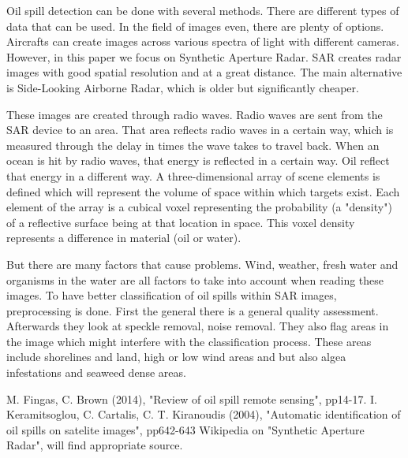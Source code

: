 \hspace{0.5cm} Oil spill detection can be done with several methods. There are different types of data that can be used. In the field of images even, there are plenty of options. Aircrafts can create images across various spectra of light with different cameras. However, in this paper we focus on Synthetic Aperture Radar. SAR creates radar images with good spatial resolution and at a great distance. The main alternative is Side-Looking Airborne Radar, which is older but significantly cheaper. 

These images are created through radio waves. Radio waves are sent from the SAR device to an area. That area reflects radio waves in a certain way, which is measured through the delay in times the wave takes to travel back. When an ocean is hit by radio waves, that energy is reflected in a certain way. Oil reflect that energy in a different way. A three-dimensional array of scene elements is defined which will represent the volume of space within which targets exist. Each element of the array is a cubical voxel representing the probability (a "density") of a reflective surface being at that location in space. This voxel density represents a difference in material (oil or water).

But there are many factors that cause problems. Wind, weather, fresh water and organisms in the water are all factors to take into account when reading these images. To have better classification of oil spills within SAR images, preprocessing is done. First the general there is a general quality assessment. Afterwards they look at speckle removal, noise removal. They also flag areas in the image which might interfere with the classification process. These areas include shorelines and land, high or low wind areas and but also algea infestations and seaweed dense areas. \newline

M. Fingas, C. Brown (2014), "Review of oil spill remote sensing", pp14-17. \newline
I. Keramitsoglou, C. Cartalis, C. T. Kiranoudis (2004), "Automatic identification of oil spills on satelite images", pp642-643\newline
Wikipedia on "Synthetic Aperture Radar", will find appropriate source.

